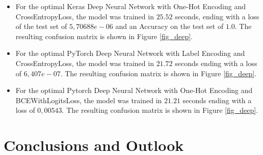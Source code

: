 \documentclass[12pt]{article}
\begin{document}
\begin{itemize}
\newpage
\item For the optimal Keras Deep Neural Network with One-Hot Encoding and CrossEntropyLoss, the model was trained in $25.52$ seconds, ending with a loss of the test set of $5,70688e-06$ and an Accuracy on the test set of $1.0$.
The resulting confusion matrix is shown in Figure \ref{fig_deep}. 

\item For the optimal PyTorch Deep Neural Network with Label Encoding and CrossEntropyLoss, the model was trained in $21.72$ seconds ending with a loss of $6,407e-07$. 
The resulting confusion matrix is shown in Figure \ref{fig_deep}.

\item For the optimal Pytorch Deep Neural Network with One-Hot Encoding and BCEWithLogitsLoss, the model was trained in $21.21$ seconds ending with a loss of $0,00543$. 
The resulting confusion matrix is shown in Figure \ref{fig_deep}.
\end{itemize}



\newpage
\section{Conclusions and Outlook}






\end{document}
